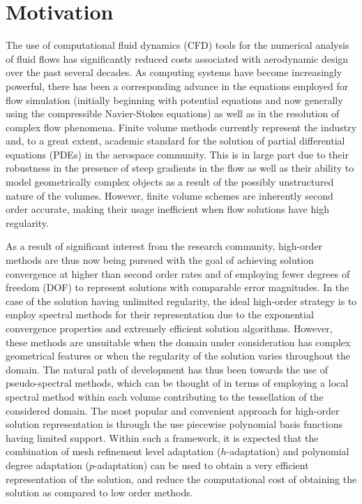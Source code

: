 \section{Motivation}
\label{sec:intro_motivation}

The use of computational fluid dynamics (CFD) tools for the numerical analysis
of fluid flows has significantly reduced costs associated with aerodynamic
design over the past several decades.
As computing systems have become
increasingly powerful, there has been a corresponding advance in the equations
employed for flow simulation (initially beginning with potential equations and
now generally using the compressible Navier-Stokes equations) as well as in the resolution of
complex flow phenomena.
Finite volume methods currently represent the industry
and, to a great extent, academic standard for the solution of partial
differential equations (PDEs) in the aerospace community.
This is in large part
due to their robustness in the presence of steep gradients in the flow as well
as their ability to model geometrically complex objects as a result of the
possibly unstructured nature of the volumes.
However, finite volume schemes are
inherently second order accurate, making their usage inefficient when flow
solutions have high regularity.

As a result of significant interest from the research community, high-order
methods are thus now being pursued with the goal of achieving solution
convergence at higher than second order rates and of employing fewer degrees of
freedom (DOF) to represent solutions with comparable error magnitudes.
In the case of the solution having unlimited regularity, the ideal high-order
strategy is to employ spectral methods for their representation due to the
exponential convergence properties and extremely efficient solution algorithms.
However, these methods are unsuitable when the domain under consideration has
complex geometrical features or when the regularity of the solution varies
throughout the domain.
The natural path of development has thus been towards the use of
pseudo-spectral methods, which can be thought of in terms of employing a local
spectral method within each volume contributing to the tessellation of the
considered domain.
The most popular and convenient approach for high-order
solution representation is through the use piecewise polynomial basis functions
having limited support.
Within such a framework, it is expected that the
combination of mesh refinement level adaptation ($h$-adaptation) and polynomial
degree adaptation ($p$-adaptation) can be used to obtain a very efficient
representation of the solution, and reduce the computational cost of obtaining
the solution as compared to low order methods.

